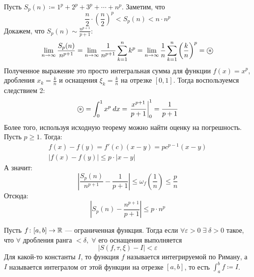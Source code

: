 \begin{example}
  Пусть $S_p(n) \coloneqq 1^p + 2^p + 3^p + \dotsb + n^p$. Заметим, что
  \begin{equation*}
    \frac{n}{2} \cdot \left(\frac{n}{2} \right)^p < S_p(n) < n \cdot n^p
  \end{equation*}
  Докажем, что $S_p(n) \sim \frac{n^{p + 1}}{p + 1}$:
  \begin{equation*}
      \lim\limits_{n \to \infty} \frac{S_p(n)}{n^{p + 1}} =
      \lim\limits_{n \to \infty} \frac{1}{n^{p + 1}}\sum_{k = 1}^{n} k^p =
      \lim\limits_{n \to \infty} \frac{1}{n}\sum_{k = 1}^{n} \left(\frac{k}{n}\right)^p = \oast
  \end{equation*}
  Полученное выражение это просто интегральная сумма для функции $f(x) = x^p$, дробления $x_k = \frac{k}{n}$ и оснащения $\xi_k = \frac{k}{n}$ на отрезке $[0, 1]$. Тогда воспользуемся следствием 2:
  \begin{equation*}
      \oast = \int_{0}^{1} x^p \: dx = \left. \frac{x^{p + 1}}{p + 1} \right|_{0}^{1} = \frac{1}{p + 1}
  \end{equation*}
  Более того, используя исходную теорему можно найти оценку на погрешность. Пусть $p \geq 1$. Тогда:
  \begin{equation*}
    \begin{gathered}
      f(x) - f(y) = f'(c)(x - y) = pc^{p - 1}(x - y) \\
      | f(x) - f(y) | \leq p \cdot |x - y|
    \end{gathered}
  \end{equation*}
  А значит:
  \begin{equation*}
    \left |
      \frac{S_p(n)}{n^{p + 1}} - \frac{1}{p + 1}
    \right |
    \leq \omega_f\left(\frac{1}{n}\right) \leq \frac{p}{n}
  \end{equation*}
  Отсюда:
  \begin{equation*}
    \left |
      S_p(n) -
      \frac{n^{p + 1}}{p + 1}
    \right |
    \leq p \cdot n^p
  \end{equation*}
\end{example}

\begin{conj}
    Пусть $f\colon [a, b] \to \mathbb{R}$ --- ограниченная функция.
    Тогда если $\forall \varepsilon > 0 \; \exists \; \delta > 0$ такое, что $\forall$ дробления ранга $< \delta,\; \forall$ его оснащения выполняется
    \begin{equation*}
        | S(f, \tau, \xi) - I| < \varepsilon
    \end{equation*}
    Для какой-то константы $I$, то функция $f$ называется интегрируемой по Риману, а $I$ называется интегралом от этой функции на отрезке $[a, b]$, то есть $\int_{a}^{b} f \coloneqq I$.
\end{conj}